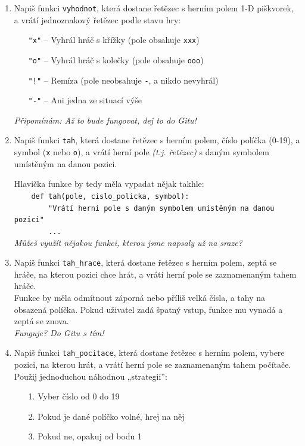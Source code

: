 \documentclass[a4paper,10pt]{article}
\begin{document}
\begin{enumerate}[resume]

\item Napiš funkci \texttt{vyhodnot}, která dostane řetězec
    s herním polem 1-D piškvorek,
    a vrátí jednoznakový řetězec podle stavu hry:
    \begin{enumerate}
    \item[\texttt{"x"}] – Vyhrál hráč s křížky (pole obsahuje \texttt{xxx})
    \item[\texttt{"o"}] – Vyhrál hráč s kolečky (pole obsahuje \texttt{ooo})
    \item[\texttt{"!"}] – Remíza (pole neobsahuje \texttt{-}, a nikdo nevyhrál)
    \item[\texttt{"-"}] – Ani jedna ze situací výše
    \end{enumerate}
    \emph{\small Připomínám: Až to bude fungovat, dej to do Gitu!}

\item Napiš funkci \texttt{tah}, která dostane řetězec s herním polem,
    číslo políčka (0-19), a symbol (\texttt{x} nebo \texttt{o}),
    a vrátí herní pole \emph{(t.j. řetězec)} s daným symbolem umístěným na danou pozici.

    Hlavička funkce by tedy měla vypadat nějak takhle:
\\\verb+    def tah(pole, cislo_policka, symbol):+
\\\verb+        "Vrátí herní pole s daným symbolem umístěným na danou pozici"+
\\\verb+        ...+
    \\\emph{Můžeš využít nějakou funkci, kterou jsme napsaly už na sraze?}

\item Napiš funkci \texttt{tah\_hrace}, která dostane řetězec s herním polem,
    zeptá se hráče, na kterou pozici chce hrát, a vrátí herní pole
    se zaznamenaným tahem hráče.
    \\Funkce by měla odmítnout záporná nebo příliš velká čísla,
    a tahy na obsazená políčka.
    Pokud uživatel zadá špatný vstup, funkce mu vynadá a zeptá se znova.
    \\\emph{\small Funguje? Do Gitu s tím!}

\item Napiš funkci \texttt{tah\_pocitace}, která dostane řetězec s herním polem,
    vybere pozici, na kterou hrát, a vrátí herní pole
    se zaznamenaným tahem počítače.
    \\Použij jednoduchou náhodnou „strategii”:
    \begin{enumerate}
    \item[1.] Vyber číslo od 0 do 19
    \item[2.] Pokud je dané políčko volné, hrej na něj
    \item[3.] Pokud ne, opakuj od bodu 1
    \end{enumerate}


\end{enumerate}
\end{document}
